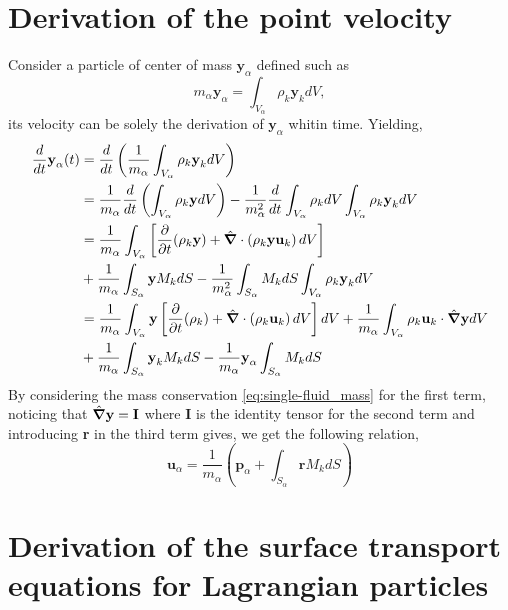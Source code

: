 \section{Derivation of the point velocity}
Consider a particle of center of mass $\textbf{y}_\alpha$ defined such as
\begin{equation*}
    m_\alpha \textbf{y}_\alpha
    = \int_{V_\alpha} \rho_k \textbf{y}_k dV,
\end{equation*}
its velocity can be solely the derivation of $\textbf{y}_\alpha$ whitin time.
Yielding, 
\begin{align*}
    \frac{d}{d t} \textbf{y}_\alpha (t)
    &=
    \frac{d}{d t} \left(
        \frac{1}{m_\alpha} \int_{V_\alpha} \rho_k \textbf{y}_k dV
    \right)\\
    &= \frac{1}{m_\alpha}
    \frac{d}{d t} 
    \left(
        \int_{V_\alpha} \rho_k \textbf{y} dV
    \right)
    - \frac{1}{m_\alpha^2} \frac{d}{d t} \int_{V_\alpha} \rho_k dV \int_{V_\alpha} \rho_k \textbf{y}_k dV
    \\
    &= \frac{1}{m_\alpha}\int_{V_\alpha} \left[
        \frac{\partial}{\partial t} (\rho_k \textbf{y}) + \hat{\bm{\nabla}} \cdot\left(\rho_k \textbf{y}\textbf{u}_k\right) dV 
    \right]\\
    &+ \frac{1}{m_\alpha}\int_{S_\alpha} \textbf{y} M_k d S
    -  \frac{1}{m_\alpha^2} \int_{S_\alpha} M_k dS  \int_{V_\alpha} \rho_k \textbf{y}_k dV
    \\
    &= \frac{1}{m_\alpha}\int_{V_\alpha} \textbf{y} \left[
    \frac{\partial}{\partial t} (\rho_k) + \hat{\bm{\nabla}} \cdot\left(\rho_k \textbf{u}_k\right) dV 
    \right]dV
    + \frac{1}{m_\alpha}\int_{V_\alpha} \rho_k  \textbf{u}_k  \cdot \hat{\bm{\nabla}} \textbf{y} dV \\
    &+ \frac{1}{m_\alpha}\int_{S_\alpha} \textbf{y}_k M_k d S
    - \frac{1}{m_\alpha}  \textbf{y}_\alpha \int_{S_\alpha} M_k dS
\end{align*}
By considering the mass conservation \ref{eq:single-fluid_mass} for the first term,  noticing that $\hat{\bm{\nabla}} \textbf{y} = \textbf{I}$ where $\textbf{I}$ is the identity tensor for the second term and introducing \textbf{r} in the third term gives, we get the following relation,
\begin{equation*}
    \textbf{u}_\alpha
    = \frac{1}{m_\alpha} \left(
        \textbf{p}_\alpha
        +  \int_{S_\alpha} \textbf{r} M_k dS
    \right)
\end{equation*}

\section{Derivation of the surface transport equations for Lagrangian particles}

